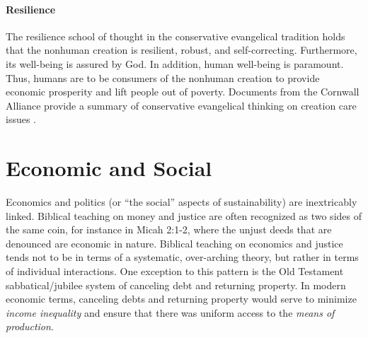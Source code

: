\documentclass[12pt]{article}
\begin{document}
\paragraph{Resilience} 
\label{sec:resilience}

The resilience school of thought in the conservative evangelical tradition
holds that the nonhuman creation is resilient, robust, and self-correcting.
Furthermore, its well-being is assured by God.
In addition, human well-being is paramount. 
Thus, humans are to be consumers of the nonhuman creation 
to provide economic prosperity and
lift people out of poverty.
Documents from the Cornwall Alliance 
provide a summary of conservative evangelical thinking on creation care issues
\autocite{Cornwall:2006aa}.



%
%
%



\section{Economic and Social}
\label{sec:economic}

Economics and politics (or ``the social'' aspects of sustainability) are inextricably linked. Biblical teaching on money
and justice are often recognized as two sides of the same coin, for instance in Micah 2:1-2, where the unjust deeds that
are denounced are economic in nature. Biblical teaching on economics and justice tends not to be in terms of a
systematic, over-arching theory, but rather in terms of individual interactions.
One exception to this pattern is the Old Testament sabbatical/jubilee system of canceling debt and returning property. 
In modern economic terms, canceling debts and returning property would serve to minimize 
\emph{income inequality} and ensure that there was uniform access to the \emph{means of production}.
\end{document}
